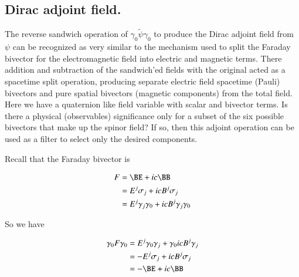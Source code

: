 \documentclass{article}
\begin{document}
\subsection{ Dirac adjoint field. }


The reverse sandwich operation of $\gamma_0 \tilde{\psi} \gamma_0$ to produce the Dirac adjoint field from $\psi$ 
can be recognized 
as very similar to the mechanism used to split the Faraday bivector for the electromagnetic field into electric and magnetic terms.  There addition and subtraction of the sandwich'ed fields with the original acted as a spacetime split operation, producing separate electric field spacetime (Pauli) bivectors and pure spatial bivectors (magnetic components) from the total field.  Here we have a
quaternion like field variable with scalar and bivector terms.  Is there a physical (observables) significance 
only for a subset of the six possible bivectors that make up the spinor field?
If so, then this adjoint operation can be used as a filter to select only the desired components.

Recall that the Faraday bivector is

\begin{align*}
F 
&= \BE + i c \BB \\
&= E^j \sigma_j + i c B^j \sigma_j \\
&= E^j \gamma_j \gamma_0 + i c B^j \gamma_j \gamma_0 \\
\end{align*}

So we have

\begin{align*}
\gamma_0 F \gamma_0
&= E^j \gamma_0 \gamma_j + \gamma_0 i c B^j \gamma_j \\
&= -E^j \sigma_j + i c B^j \sigma_j \\
&= -\BE + i c \BB
\end{align*}
\end{document}
